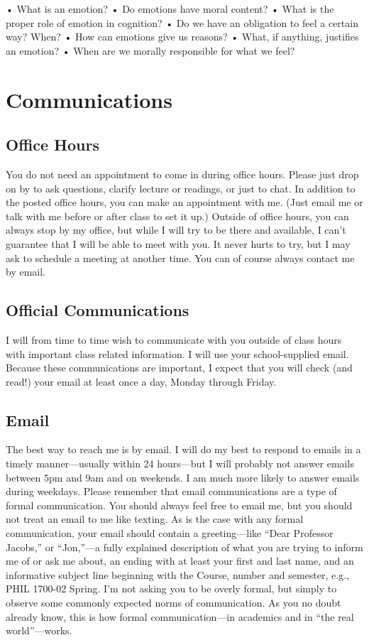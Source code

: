 \documentclass[11pt,]{article}
\begin{document}
• What is an emotion? • Do emotions have moral content? • What is the
proper role of emotion in cognition? • Do we have an obligation to feel
a certain way? When? • How can emotions give us reasons? • What, if
anything, justifies an emotion? • When are we morally responsible for
what we feel?

\section{Communications}\label{communications}

\subsection{Office Hours}\label{office-hours}

You do not need an appointment to come in during office hours. Please
just drop on by to ask questions, clarify lecture or readings, or just
to chat. In addition to the posted office hours, you can make an
appointment with me. (Just email me or talk with me before or after
class to set it up.) Outside of office hours, you can always stop by my
office, but while I will try to be there and available, I can't
guarantee that I will be able to meet with you. It never hurts to try,
but I may ask to schedule a meeting at another time. You can of course
always contact me by email.

\subsection{Official Communications}\label{official-communications}

I will from time to time wish to communicate with you outside of class
hours with important class related information. I will use your
school-supplied email. Because these communications are important, I
expect that you will check (and read!) your email at least once a day,
Monday through Friday.

\subsection{Email}\label{email}

The best way to reach me is by email. I will do my best to respond to
emails in a timely manner---usually within 24 hours---but I will
probably not answer emails between 5pm and 9am and on weekends. I am
much more likely to answer emails during weekdays. Please remember that
email communications are a type of formal communication. You should
always feel free to email me, but you should not treat an email to me
like texting. As is the case with any formal communication, your email
should contain a greeting---like ``Dear Professor Jacobs,'' or
``Jon,''---a fully explained description of what you are trying to
inform me of or ask me about, an ending with at least your first and
last name, and an informative subject line beginning with the Course,
number and semester, e.g., PHIL 1700-02 Spring. I'm not asking you to be
overly formal, but simply to observe some commonly expected norms of
communication. As you no doubt already know, this is how formal
communication---in academics and in ``the real world''---works.
\end{document}
